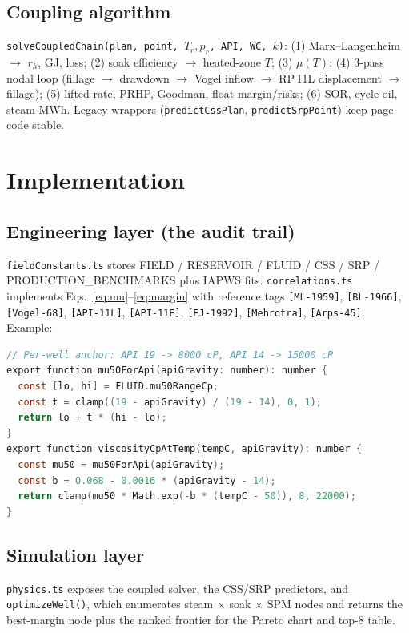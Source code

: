 \documentclass[12pt,a4paper]{report}
\begin{document}
\section{Coupling algorithm}
\texttt{solveCoupledChain(plan, point, $T_r,p_r$, API, WC, $k$)}:
(1) Marx--Langenheim $\rightarrow$ $r_h$, GJ, loss; (2) soak efficiency
$\rightarrow$ heated-zone $T$; (3) $\mu(T)$; (4) 3-pass nodal loop
(fillage $\rightarrow$ drawdown $\rightarrow$ Vogel inflow $\rightarrow$
RP\,11L displacement $\rightarrow$ fillage); (5) lifted rate, PRHP, Goodman,
float margin/risks; (6) SOR, cycle oil, steam MWh. Legacy wrappers
(\texttt{predictCssPlan}, \texttt{predictSrpPoint}) keep page code stable.

\chapter{Implementation}
\section{Engineering layer (the audit trail)}
\texttt{fieldConstants.ts} stores FIELD / RESERVOIR / FLUID / CSS / SRP /
PRODUCTION\_BENCHMARKS plus IAPWS fits. \texttt{correlations.ts} implements
Eqs.~\ref{eq:mu}--\ref{eq:margin} with reference tags
\texttt{[ML-1959]}, \texttt{[BL-1966]}, \texttt{[Vogel-68]},
\texttt{[API-11L]}, \texttt{[API-11E]}, \texttt{[EJ-1992]},
\texttt{[Mehrotra]}, \texttt{[Arps-45]}. Example:
\begin{lstlisting}[language=C]
// Per-well anchor: API 19 -> 8000 cP, API 14 -> 15000 cP
export function mu50ForApi(apiGravity: number): number {
  const [lo, hi] = FLUID.mu50RangeCp;
  const t = clamp((19 - apiGravity) / (19 - 14), 0, 1);
  return lo + t * (hi - lo);
}
export function viscosityCpAtTemp(tempC, apiGravity): number {
  const mu50 = mu50ForApi(apiGravity);
  const b = 0.068 - 0.0016 * (apiGravity - 14);
  return clamp(mu50 * Math.exp(-b * (tempC - 50)), 8, 22000);
}
\end{lstlisting}

\section{Simulation layer}
\texttt{physics.ts} exposes the coupled solver, the CSS/SRP predictors, and
\texttt{optimizeWell()}, which enumerates steam $\times$ soak $\times$ SPM
nodes and returns the best-margin node plus the ranked frontier for the Pareto
chart and top-8 table.
\end{document}
